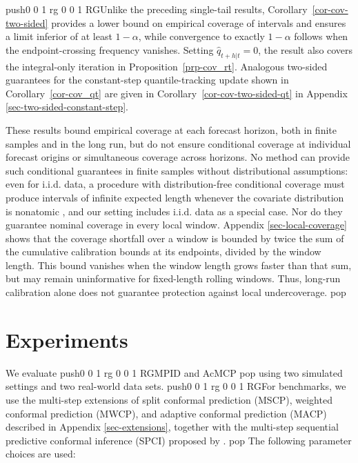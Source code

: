 \documentclass[
  american,
  12pt]{article}
\theoremstyle{plain}
\theoremstyle{plain}
\theoremstyle{remark}
\newcommand{\CPTSadd}[1]{\ifmmode\else\leavevmode\fi\pdfcolorstack 0 push{0 0 1 rg 0 0 1 RG}#1\pdfcolorstack 0 pop}
\begin{document}
\CPTSadd{Unlike the preceding single-tail results,
Corollary~\ref{cor-cov-two-sided} provides a lower bound on empirical
coverage of intervals and ensures a limit inferior of at least
\(1-\alpha\), while convergence to exactly \(1-\alpha\) follows when the
endpoint-crossing frequency vanishes. Setting \(\hat q_{t+h|t}=0\), the
result also covers the integral-only iteration in
Proposition~\ref{prp-cov_rt}. Analogous two-sided guarantees for the
constant-step quantile-tracking update shown in
Corollary~\ref{cor-cov_qt} are given in
Corollary~\ref{cor-cov-two-sided-qt} in Appendix
\ref{sec-two-sided-constant-step}.

These results bound empirical coverage at each forecast horizon, both in
finite samples and in the long run, but do not ensure conditional
coverage at individual forecast origins or simultaneous coverage across
horizons. No method can provide such conditional guarantees in finite
samples without distributional assumptions: even for i.i.d. data, a
procedure with distribution-free conditional coverage must produce
intervals of infinite expected length whenever the covariate
distribution is nonatomic \citep{lei2014, barber2021limits}, and our
setting includes i.i.d. data as a special case. Nor do they guarantee
nominal coverage in every local window. Appendix
\ref{sec-local-coverage} shows that the coverage shortfall over a window
is bounded by twice the sum of the cumulative calibration bounds at its
endpoints, divided by the window length. This bound vanishes when the
window length grows faster than that sum, but may remain uninformative
for fixed-length rolling windows. Thus, long-run calibration alone does
not guarantee protection against local undercoverage.}

\section{Experiments}\label{sec-experiments}

We evaluate \CPTSadd{MPID and AcMCP} using two simulated settings and two
real-world data sets. \CPTSadd{For benchmarks, we use the multi-step extensions
of split conformal prediction (MSCP), weighted conformal prediction
(MWCP), and adaptive conformal prediction (MACP) described in Appendix
\ref{sec-extensions}, together with the multi-step sequential predictive
conformal inference (SPCI) proposed by \citet{xu2023}.} The following
parameter choices are used:
\end{document}
